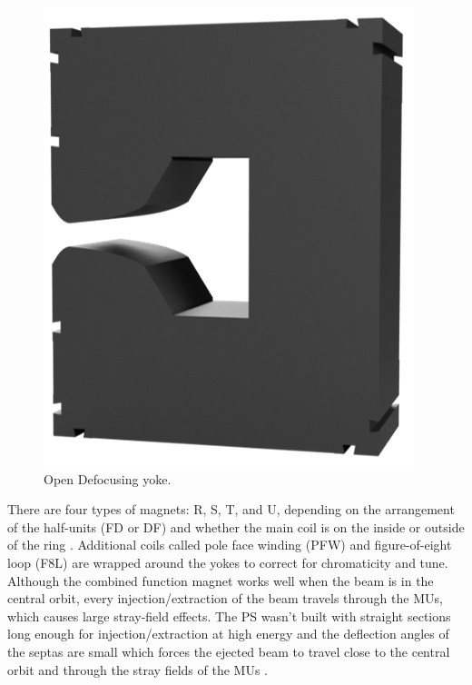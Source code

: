 \documentclass[a4paper,
               biblatex,     %
               keeplastbox,   %
               ]{jacow}
\begin{document}
\begin{figure}[!htb]
  \hfill
  \begin{minipage}[b]{0.45\columnwidth}
    \includegraphics*[width=\textwidth]{defocusing}
    \caption{Open Defocusing yoke.}
    \label{fig:defocusing}
  \end{minipage}
\end{figure}

There are four types of magnets: R, S, T, and U, depending on the arrangement of the half-units (FD or DF) and whether the main coil is on the inside or outside of the ring \cite{steerenberg_fifty_2011}. Additional coils called pole face winding (PFW) and figure-of-eight loop (F8L) are wrapped around the yokes to correct for chromaticity and tune. Although the combined function magnet works well when the beam is in the central orbit, every injection/extraction of the beam travels through the MUs, which causes large stray-field effects. The PS wasn't built with straight sections long enough for injection/extraction at high energy and the deflection angles of the septas are small which forces the ejected beam to travel close to the central orbit and through the stray fields of the MUs \cite{risselada_beam_nodate}.
\end{document}
